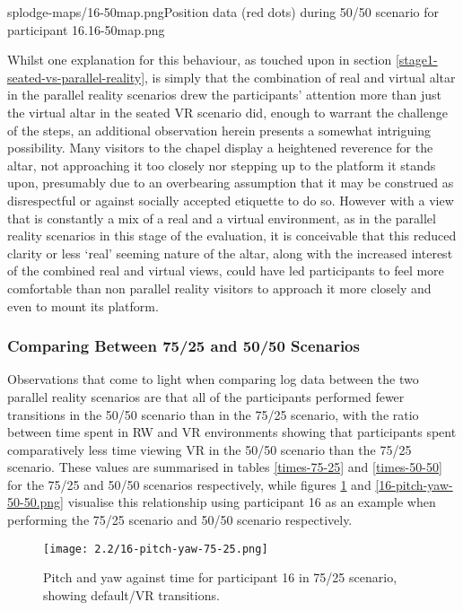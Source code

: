       {splodge-maps/16-50map.png}{Position data (red dots) during 50/50 scenario for participant 16.}{16-50map.png}

Whilst one explanation for this behaviour, as touched upon in section \ref{stage1-seated-vs-parallel-reality}, is simply that the combination of real and virtual altar in the parallel reality scenarios drew the participants' attention more than just the virtual altar in the seated VR scenario did, enough to warrant the challenge of the steps, an additional observation herein presents a somewhat intriguing possibility. Many visitors to the chapel display a heightened reverence for the altar, not approaching it too closely nor stepping up to the platform it stands upon, presumably due to an overbearing assumption that it may be construed as disrespectful or against socially accepted etiquette to do so. However with a view that is constantly a mix of a real and a virtual environment, as in the parallel reality scenarios in this stage of the evaluation, it is conceivable that this reduced clarity or less `real' seeming nature of the altar, along with the increased interest of the combined real and virtual views, could have led participants to feel more comfortable than non parallel reality visitors to approach it more closely and even to mount its platform.


\subsubsection{Comparing Between 75/25 and 50/50 Scenarios}

Observations that come to light when comparing log data between the two parallel reality scenarios are that all of the participants performed fewer transitions in the 50/50 scenario than in the 75/25 scenario, with the ratio between time spent in RW and VR environments showing that participants spent comparatively less time viewing VR in the 50/50 scenario than the 75/25 scenario. These values are summarised in tables \ref{times-75-25} and \ref{times-50-50} for the 75/25 and 50/50 scenarios respectively, while figures \ref{16-pitch-yaw-75-25.png} and \ref{16-pitch-yaw-50-50.png} visualise this relationship using participant 16 as an example when performing the 75/25 scenario and 50/50 scenario respectively.

\begin{figure}[h]
	\begin{center}
	\texttt{[image: 2.2/16-pitch-yaw-75-25.png]}
	\caption{Pitch and yaw against time for participant 16 in 75/25 scenario, showing default/VR transitions.}
	\label{16-pitch-yaw-75-25.png}
	\end{center}
\end{figure}

